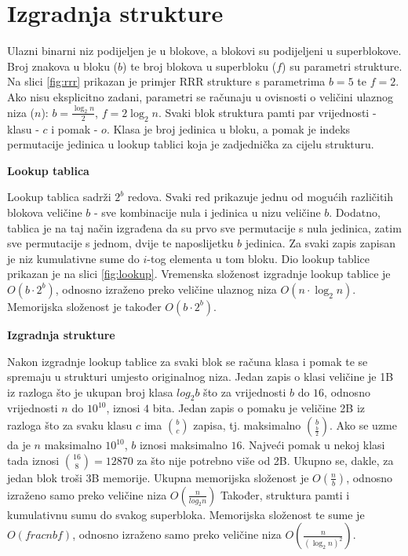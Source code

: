 \documentclass[times, utf8, seminar, numeric]{fer}
\begin{document}
\section{Izgradnja strukture}
\label{sec:izgradnja-rrr}
Ulazni binarni niz podijeljen je u blokove, a blokovi su podijeljeni u superblokove. Broj znakova u bloku ($b$) te broj blokova u superbloku ($f$) su parametri strukture. Na slici \ref{fig:rrr} prikazan je primjer RRR strukture s parametrima $b=5$ te $f=2$. Ako nisu eksplicitno zadani, parametri se računaju u ovisnosti o veličini ulaznog niza ($n$):
$b=\frac{\log_2n}{2}$,
$f=2  \log_2n$.
Svaki blok struktura pamti par vrijednosti - klasu  - $c$ i pomak  - $o$. Klasa je broj jedinica u bloku, a pomak je indeks permutacije jedinica u lookup tablici koja je zadjednička za cijelu strukturu. 

\textbf{Lookup tablica}

Lookup tablica sadrži $2^b$ redova. Svaki red prikazuje jednu od mogućih različitih blokova veličine $b$ - sve kombinacije nula i jedinica u nizu veličine $b$. Dodatno, tablica je na taj način izgrađena da su prvo sve permutacije s nula jedinica, zatim sve permutacije s jednom, dvije te naposlijetku $b$ jedinica. Za svaki zapis zapisan je niz kumulativne sume do $i$-tog elementa u tom bloku. Dio lookup tablice prikazan je na slici \ref{fig:lookup}. Vremenska složenost izgradnje lookup tablice je $O(b \cdot 2^b)$, odnosno izraženo preko veličine ulaznog niza $O(n \cdot \log_2n)$. Memorijska složenost je također $O(b \cdot 2^b)$.

\textbf{Izgradnja strukture}

Nakon izgradnje lookup tablice za svaki blok se računa klasa i pomak te se spremaju u strukturi umjesto originalnog niza. Jedan zapis o klasi veličine je 1B iz razloga što je ukupan broj klasa $log_2b$ što za vrijednosti $b$ do $16$, odnosno vrijednosti $n$ do $10^{10}$, iznosi $4$ bita. Jedan zapis o pomaku je veličine 2B iz razloga što za svaku klasu $c$ ima $\binom{b}{c}$ zapisa, tj. maksimalno $\binom{b}{\frac{b}{2}}$. Ako se uzme da je $n$ maksimalno $10^{10}$, $b$ iznosi maksimalno $16$. Najveći pomak u nekoj klasi tada iznosi $\binom{16}{8}=12870$ za što nije potrebno više od 2B.  Ukupno se, dakle, za jedan blok troši 3B memorije. Ukupna memorijska složenost je $O(\frac{n}{b})$, odnosno izraženo samo preko veličine niza $O(\frac{n}{log_2n})$
Također, struktura pamti i kumulativnu sumu do svakog superbloka. Memorijska složenost te sume je $O(frac{n}{b f})$, odnosno izraženo samo preko veličine niza $O(\frac{n}{(\log_2n)^2})$.
\end{document}
